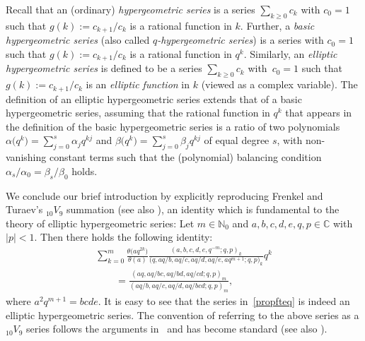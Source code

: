 \documentclass[10pt,a4paper]{amsart}
\numberwithin{equation}{section}
\theoremstyle{definition}
\newcommand{\ta}{\theta}
\newcommand{\C}{\mathbb C}
\newcommand{\N}{\mathbb N}
\begin{document}
Recall that an (ordinary) \textit{hypergeometric series} is
a series $\sum_{k\ge 0}c_k$ with $c_0=1$ such that $g(k):=c_{k+1}/c_k$
is a rational function in $k$. Further, a \textit{basic hypergeometric series}
(also called \textit{$q$-hypergeometric series}) is
a series  with $c_0=1$ such that $g(k):=c_{k+1}/c_k$
is a rational function in $q^k$. Similarly, an \textit{elliptic
hypergeometric series} is defined to be a series $\sum_{k\ge 0}c_k$
with~${c_0=1}$ such that $g(k):=c_{k+1}/c_k$ is an \textit{elliptic function}
in $k$ (viewed as a complex variable).
The definition of an elliptic hypergeometric series extends that
of a basic hypergeometric series, assuming that
the rational function in $q^k$ that appears in the definition
of the basic hypergeometric series is a ratio
of two polynomials $\alpha\bigl(q^k\bigr)=\sum_{j=0}^s\alpha_jq^{kj}$ and
$\beta\bigl(q^k\bigr)=\sum_{j=0}^s\beta_jq^{kj}$
of equal degree $s$, with non-vanishing constant terms
such that the (polynomial) balancing condition~${\alpha_s/\alpha_0
=\beta_s/\beta_0}$ holds.


We conclude our brief introduction by explicitly reproducing
Frenkel and Turaev's ${}_{10}V_9$ summation \cite{FT}
(see also \cite[equation~(11.4.1)]{GR}),
an identity which is fundamental to the
theory of elliptic hypergeometric series:
Let $m\in\N_0$ and $a,b,c,d,e,q,p\in\C$ with $|p|<1$.
Then there holds the following identity:
\begin{gather}
\sum_{k=0}^m\frac{\ta\bigl(aq^{2k}\bigr)}{\ta(a)}
\frac{(a,b,c,d,e,q^{-m};q,p)_k}
{\bigl(q,aq/b,aq/c,aq/d,aq/e,aq^{m+1};q,p\bigr)_k}q^k\nonumber\\
\qquad
=\frac{(aq,aq/bc,aq/bd,aq/cd;q,p)_m}
{(aq/b,aq/c,aq/d,aq/bcd;q,p)_m},\label{propfteq}
\end{gather}
where $a^2q^{m+1}=bcde$.
It is easy to see that the series in~\eqref{propfteq}
is indeed an elliptic hypergeometric series.
The convention of referring to the above series as a
${}_{10}V_9$ series follows the arguments
in~\cite{Sp02b} and has become standard
(see also \cite[Chapter~11]{GR}).
\end{document}
